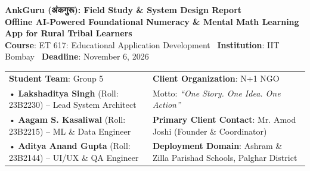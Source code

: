 \documentclass[10pt,a4paper]{article}
\begin{document}
\begin{center}
    {\Large\textbf{\textcolor{primary}{AnkGuru (अंकगुरू): Field Study \& System Design Report}}}\\[1pt]
    {\small\textbf{\textcolor{secondary}{Offline AI-Powered Foundational Numeracy \& Mental Math Learning App for Rural Tribal Learners}}}\\[2pt]
    {\scriptsize\textbf{Course}: ET 617: Educational Application Development \textbar\ \textbf{Institution}: IIT Bombay \textbar\ \textbf{Deadline}: November 6, 2026}
\end{center}

\vspace{-4pt}
\begin{tcolorbox}[colback=white,colframe=primary,boxrule=0.7pt,arc=2pt,left=5pt,right=5pt,top=3pt,bottom=3pt]
\scriptsize
\begin{tabularx}{\textwidth}{@{}X X@{}}
\textbf{Student Team}: Group 5 & \textbf{Client Organization}: N+1 NGO \\
• \textbf{Lakshaditya Singh} (Roll: 23B2230) -- Lead System Architect & Motto: \textit{``One Story. One Idea. One Action''} \\
• \textbf{Aagam S. Kasaliwal} (Roll: 23B2215) -- ML \& Data Engineer & \textbf{Primary Client Contact}: Mr. Amod Joshi (Founder \& Coordinator) \\
• \textbf{Aditya Anand Gupta} (Roll: 23B2144) -- UI/UX \& QA Engineer & \textbf{Deployment Domain}: Ashram \& Zilla Parishad Schools, Palghar District \\
\end{tabularx}
\end{tcolorbox}

\vspace{-4pt}
\end{document}
